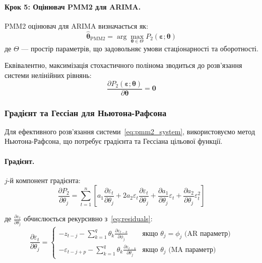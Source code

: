 \documentclass[12pt,a4paper]{article}
\begin{document}
\paragraph{Крок 5: Оцінювач PMM2 для ARIMA.}

PMM2 оцінювач для ARIMA визначається як:
\begin{equation}
\label{eq:pmm2_arima_estimator}
\hat{\boldsymbol{\theta}}_{\text{PMM2}} = \arg\max_{\boldsymbol{\theta} \in \Theta} P_2(\boldsymbol{\varepsilon}; \boldsymbol{\theta})
\end{equation}
де $\Theta$ --- простір параметрів, що задовольняє умови стаціонарності та оборотності.

Еквівалентно, максимізація стохастичного полінома зводиться до розв'язання системи нелінійних рівнянь:
\begin{equation}
\label{eq:pmm2_system}
\frac{\partial P_2(\boldsymbol{\varepsilon}; \boldsymbol{\theta})}{\partial \boldsymbol{\theta}} = \mathbf{0}
\end{equation}

\subsubsection{Градієнт та Гессіан для Ньютона-Рафсона}

Для ефективного розв'язання системи~\eqref{eq:pmm2_system}, використовуємо метод Ньютона-Рафсона, що потребує градієнта та Гессіана цільової функції.

\paragraph{Градієнт.}

$j$-й компонент градієнта:
\begin{equation}
\label{eq:gradient_j}
\frac{\partial P_2}{\partial \theta_j} = \sum_{t=1}^{n} \left[ a_1 \frac{\partial \varepsilon_t}{\partial \theta_j} + 2 a_2 \varepsilon_t \frac{\partial \varepsilon_t}{\partial \theta_j} + \frac{\partial a_1}{\partial \theta_j} \varepsilon_t + \frac{\partial a_2}{\partial \theta_j} \varepsilon_t^2 \right]
\end{equation}

де $\frac{\partial \varepsilon_t}{\partial \theta_j}$ обчислюється рекурсивно з~\eqref{eq:residuals}:
\begin{equation}
\label{eq:residual_derivative}
\frac{\partial \varepsilon_t}{\partial \theta_j} = \begin{cases}
-z_{t-j} - \sum_{k=1}^{q} \theta_k \frac{\partial \varepsilon_{t-k}}{\partial \phi_j} & \text{якщо } \theta_j = \phi_j \text{ (AR параметр)} \\
-\varepsilon_{t-j+p} - \sum_{k=1}^{q} \theta_k \frac{\partial \varepsilon_{t-k}}{\partial \theta_j} & \text{якщо } \theta_j \text{ (MA параметр)}
\end{cases}
\end{equation}
\end{document}
